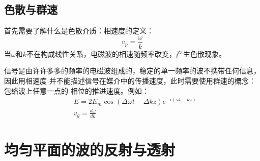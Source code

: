 \documentclass[UTF8]{article}
\begin{document}
\subsection{色散与群速}
首先需要了解什么是色散介质：相速度的定义：
$$v_p = \frac{\omega}{k}$$
当$\omega$和$k$不在构成线性关系，电磁波的相速随频率改变，产生色散现象。

信号是由许许多多的频率的电磁波组成的，稳定的单一频率的波不携带任何信息，因此用相速度
并不能描述信号在媒介中的传播速度，此时需要使用群速的概念：包络波上任意一点的
相位的推进速度。例如：
\begin{align}
    &E = 2E_m \cos (\Delta \omega t - \Delta k z) e^{-i(\omega t -k z)}\\
    &v_g = \frac{d\omega}{dk}
\end{align}

\section{均匀平面的波的反射与透射}
\end{document}
